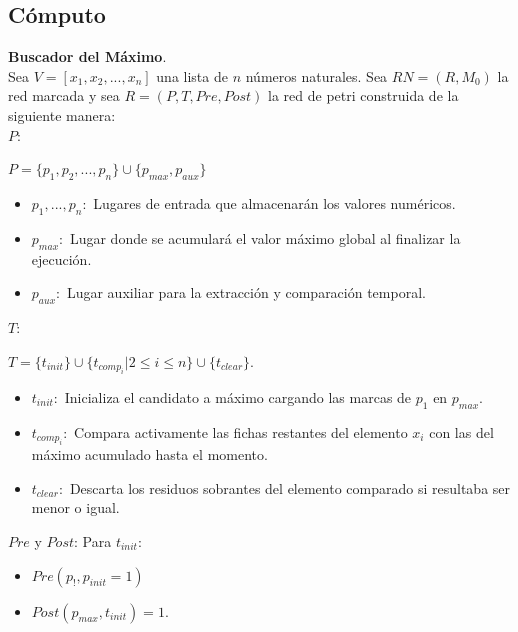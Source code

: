 \subsection{Cómputo}
\textbf{Buscador  del Máximo}.\\
Sea $V=[x_1,x_2,...,x_n]$ una lista de $n$ números naturales. Sea $RN = (R,M_0)$ la red marcada y sea $R=(P,T,Pre,Post)$ la red de petri construida de la siguiente manera: \\
$P:$ \begin{center}
    $P=\{ p_1,p_2,...,p_n\}\cup\{p_{max},p_{aux}\}$  
\end{center}
\begin{itemize}
    \item $p_1,...,p_n:$ Lugares de entrada que almacenarán los valores numéricos.
    \item $p_{max}:$ Lugar donde se acumulará el valor máximo global al finalizar la ejecución.
    \item $p_{aux}:$ Lugar auxiliar para la extracción y comparación temporal.
\end{itemize}
$T:$\begin{center}
    $T=\{ t_{init} \}\cup\{t_{comp_i}|2\leq i \leq n \} \cup \{ t_{clear}\}$.
\end{center}
\begin{itemize}
    \item $t_{init}:$ Inicializa el candidato a máximo cargando las marcas de $p_1$ en $p_{max}$.
    \item $t_{comp_i}:$ Compara activamente las fichas restantes del elemento $x_i$ con las del máximo acumulado hasta el momento.
    \item $t_{clear}:$ Descarta los residuos sobrantes del elemento comparado si resultaba ser menor o igual.
\end{itemize}
$Pre$ y $Post$:
Para $t_{init}:$ \begin{itemize}
    \item $Pre(p_!,p_{init}=1)$
    \item $Post(p_{max},t_{init})=1.$
\end{itemize} 
 

